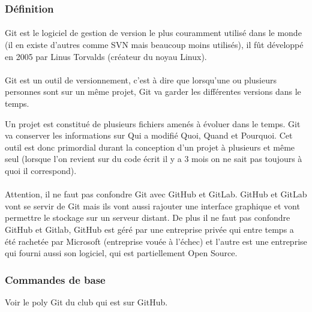 \subsubsection*{Définition}

\paragraph{} Git est le logiciel de gestion de version le plus couramment
utilisé dans le monde (il en existe d'autres comme SVN mais beaucoup moins
utilisés), il fût développé en 2005 par Linus Torvalds (créateur du noyau
Linux).

\paragraph{} Git est un outil de versionnement, c'est à dire que lorsqu'une ou
plusieurs personnes sont sur un même projet, Git va garder les différentes
versions dans le temps.

Un projet est constitué de plusieurs fichiers amenés à évoluer dans le temps.
Git va conserver les informations sur Qui a modifié Quoi, Quand et Pourquoi.
Cet outil est donc primordial durant la conception d'un projet à plusieurs et
même seul (lorsque l'on revient sur du code écrit il y a 3 mois on ne sait pas
toujours à quoi il correspond).

\paragraph{} Attention, il ne faut pas confondre Git avec GitHub et GitLab.
GitHub et GitLab vont se servir de Git mais ils vont aussi rajouter une
interface graphique et vont permettre le stockage sur un serveur distant. De
plus il ne faut pas confondre GitHub et Gitlab, GitHub est géré par une
entreprise privée qui entre temps a été rachetée par Microsoft (entreprise
vouée à l'échec) et l'autre est une entreprise qui fourni aussi son logiciel,
qui est partiellement Open Source.

\subsubsection*{Commandes de base}

Voir le poly Git du club qui est sur GitHub.
